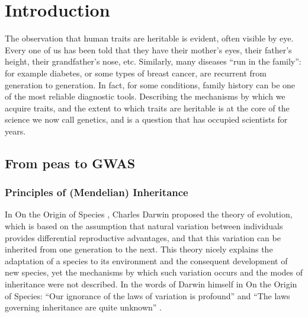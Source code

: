 \chapter{Introduction}  %

The observation that human traits are heritable is evident, often visible by eye. 
Every one of us has been told that they have their mother’s eyes, their father’s height, their grandfather’s nose, etc. 
Similarly, many diseases “run in the family”: for example diabetes, or some types of breast cancer, are recurrent from generation to generation. 
In fact, for some conditions, family history can be one of the most reliable diagnostic tools. 
Describing the mechanisms by which we acquire traits, and the extent to which traits are heritable is at the core of the science we now call genetics, and is a question that has occupied scientists for years.

\section{From peas to GWAS}  %

\subsection{Principles of (Mendelian) Inheritance} %

In On the Origin of Species \cite{darwin1859origin}, Charles Darwin proposed the theory of evolution, which is based on the assumption that natural variation between individuals provides differential reproductive advantages, and that this variation can be inherited from one generation to the next. 
This theory nicely explains the adaptation of a species to its environment and the consequent development of new species, yet the mechanisms by which such variation occurs and the modes of inheritance were not described. 
In the words of Darwin himself in On the Origin of Species: “Our ignorance of the laws of variation is profound” and “The laws governing inheritance are quite unknown” \cite{darwin1859origin}.\\

